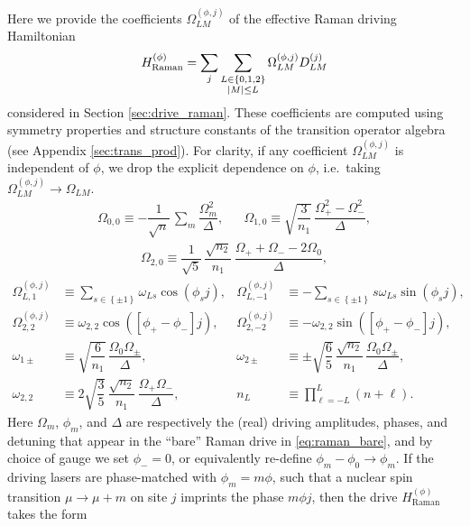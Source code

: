 \documentclass[nofootinbib,notitlepage,11pt]{revtex4-2}
\renewcommand{\t}{\text} %
\newcommand{\f}[2]{\dfrac{#1}{#2}} %
\newcommand{\p}[1]{\left(#1\right)} %
\renewcommand{\sp}[1]{\left[#1\right]} %
\renewcommand{\set}[1]{\left\{#1\right\}} %
\newcommand{\1}{\mathds{1}}
\begin{document}
Here we provide the coefficients $\Omega_{LM}^{(\phi,j)}$ of the
effective Raman driving Hamiltonian
\begin{align}
  H_{\t{Raman}}^{(\phi)}
  = \sum_j \sum_{\substack{L\in\set{0,1,2}\\\abs{M}\le L}}
  \Omega_{LM}^{(\phi,j)} D_{LM}^{(j)}
\end{align}
considered in Section \ref{sec:drive_raman}.  These coefficients are
computed using symmetry properties and structure constants of the
transition operator algebra (see Appendix \ref{sec:trans_prod}).  For
clarity, if any coefficient $\Omega_{LM}^{(\phi,j)}$ is independent of
$\phi$, we drop the explicit dependence on $\phi$, i.e.~taking
$\Omega_{LM}^{(\phi,j)}\to\Omega_{LM}$.
\begin{align}
  \Omega_{0,0} \equiv -\f1{\sqrt{n}}\,
  \sum_m\f{\Omega_m^2}{\Delta},
  &&
  \Omega_{1,0} \equiv \sqrt{\f{3}{n_1}}\,
  \f{\Omega_+^2 - \Omega_-^2}{\Delta},
  \label{eq:O_01_0}
\end{align}
\begin{align}
  \Omega_{2,0} \equiv \f1{\sqrt{5}}\, \f{\sqrt{n_2}}{n_1}\,
  \f{\Omega_+ + \Omega_- - 2\Omega_0}{\Delta},
  \label{eq:O_2_0}
\end{align}
\begin{align}
  \Omega_{L,1}^{(\phi,j)}
  &\equiv \sum_{s\in\set{\pm1}} \omega_{Ls} \cos\p{\phi_s j},
  &
  \Omega_{L,-1}^{(\phi,j)}
  &\equiv -\sum_{s\in\set{\pm1}} s \omega_{Ls} \sin\p{\phi_s j}, \\
  \Omega_{2,2}^{(\phi,j)}
  &\equiv \omega_{2,2} \cos\p{\sp{\phi_+-\phi_-}j},
  &
  \Omega_{2,-2}^{(\phi,j)}
  &\equiv -\omega_{2,2} \sin\p{\sp{\phi_+-\phi_-}j}, \\
  \omega_{1\pm}
  &\equiv \sqrt{\f{6}{n_1}}\, \f{\Omega_0 \Omega_\pm}{\Delta},
  &
  \omega_{2\pm}
  &\equiv \pm \sqrt{\f65}\, \f{\sqrt{n_2}}{n_1}\,
  \f{\Omega_0\Omega_\pm}{\Delta}, \\
  \omega_{2,2}
  &\equiv 2\sqrt{\f35}\, \f{\sqrt{n_2}}{n_1}\,
  \f{\Omega_+\Omega_-}{\Delta},
  &
  n_L
  &\equiv \prod_{\ell=-L}^L \p{n+\ell}.
\end{align}
Here $\Omega_m$, $\phi_m$, and $\Delta$ are respectively the (real)
driving amplitudes, phases, and detuning that appear in the ``bare''
Raman drive in \eqref{eq:raman_bare}, and by choice of gauge we set
$\phi_-=0$, or equivalently re-define $\phi_m-\phi_0\to\phi_m$.  If
the driving lasers are phase-matched with $\phi_m=m\phi$, such that a
nuclear spin transition $\mu\to\mu+m$ on site $j$ imprints the phase
$m\phi j$, then the drive $H_{\t{Raman}}^{(\phi)}$ takes the form
\end{document}
